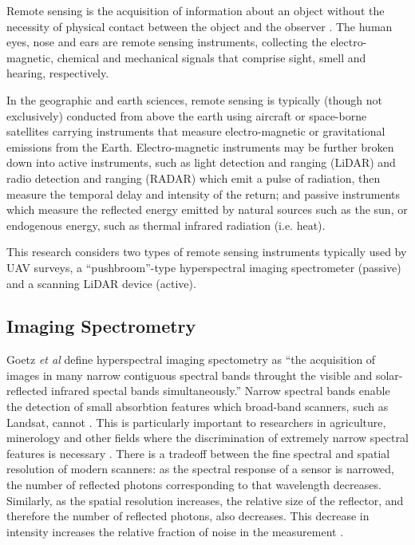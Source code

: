 \documentclass[10pt]{article}
\begin{document}
Remote sensing is the acquisition of information about an object without the necessity of physical contact between the object and the observer \cite{Gupta2018}. The human eyes, nose and ears are remote sensing instruments, collecting the electro-magnetic, chemical and mechanical signals that comprise sight, smell and hearing, respectively.

In the geographic and earth sciences, remote sensing is typically (though not exclusively) conducted from above the earth using aircraft or space-borne satellites carrying instruments that measure electro-magnetic or gravitational emissions from the Earth. Electro-magnetic instruments may be further broken down into active instruments, such as light detection and ranging (LiDAR) and radio detection and ranging (RADAR) which emit a pulse of radiation, then measure the temporal delay and intensity of the return; and passive instruments which measure the reflected energy emitted by natural sources such as the sun, or endogenous energy, such as thermal infrared radiation (i.e. heat).

This research considers two types of remote sensing instruments typically used by UAV surveys, a ``pushbroom''-type hyperspectral imaging spectrometer (passive) and a scanning LiDAR device (active). 

\subsection{Imaging Spectrometry}

Goetz \emph{et al} \cite{Goetz1985} define hyperspectral imaging spectometry as ``the acquisition of images in many narrow contiguous spectral bands throught the visible and solar-reflected infrared spectal bands simultaneously.'' Narrow spectral bands enable the detection of small absorbtion features which broad-band scanners, such as Landsat, cannot \cite{Goetz1985}. This is particularly important to researchers in agriculture, minerology and other fields where the discrimination of extremely narrow spectral features is necessary \cite{Goetz1985}. There is a tradeoff between the fine spectral and spatial resolution of modern scanners: as the spectral response of a sensor is narrowed, the number of reflected photons corresponding to that wavelength decreases. Similarly, as the spatial resolution increases, the relative size of the reflector, and therefore the number of reflected photons, also decreases. This decrease in intensity increases the relative fraction of noise in the measurement \cite{Moses2012}.
\end{document}

